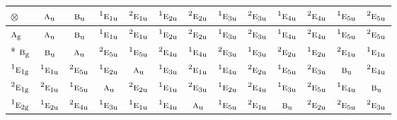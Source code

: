 \documentclass[10pt,a4paper]{article}
\numberwithin{equation}{section}
\newcommand{\irr}[1]{\text{\normalfont\scshape #1}}
\newcommand{\conjpair}[1]{{}^{#1}}
\newcommand{\ptag}[1]{\mathrm{#1}}
\newcommand{\irrprod}{\otimes}
\begin{document}
{\small\setlength{\tabcolsep}{3pt}\begin{longtable}{@{}lcccccccccccc@{}}\toprule
$\irrprod$ & $\irr{a}_{\ptag{u}}$ & $\irr{b}_{\ptag{u}}$ & $\conjpair{1}\irr{e}_{1\ptag{u}}$ & $\conjpair{2}\irr{e}_{1\ptag{u}}$ & $\conjpair{1}\irr{e}_{2\ptag{u}}$ & $\conjpair{2}\irr{e}_{2\ptag{u}}$ & $\conjpair{1}\irr{e}_{3\ptag{u}}$ & $\conjpair{2}\irr{e}_{3\ptag{u}}$ & $\conjpair{1}\irr{e}_{4\ptag{u}}$ & $\conjpair{2}\irr{e}_{4\ptag{u}}$ & $\conjpair{1}\irr{e}_{5\ptag{u}}$ & $\conjpair{2}\irr{e}_{5\ptag{u}}$\\\midrule\endhead
\bottomrule\endfoot\endlastfoot
$\irr{a}_{\ptag{g}}$ & $\irr{a}_{\ptag{u}}$ & $\irr{b}_{\ptag{u}}$ & $\conjpair{1}\irr{e}_{1\ptag{u}}$ & $\conjpair{2}\irr{e}_{1\ptag{u}}$ & $\conjpair{1}\irr{e}_{2\ptag{u}}$ & $\conjpair{2}\irr{e}_{2\ptag{u}}$ & $\conjpair{1}\irr{e}_{3\ptag{u}}$ & $\conjpair{2}\irr{e}_{3\ptag{u}}$ & $\conjpair{1}\irr{e}_{4\ptag{u}}$ & $\conjpair{2}\irr{e}_{4\ptag{u}}$ & $\conjpair{1}\irr{e}_{5\ptag{u}}$ & $\conjpair{2}\irr{e}_{5\ptag{u}}$\\*
$\irr{b}_{\ptag{g}}$ & $\irr{b}_{\ptag{u}}$ & $\irr{a}_{\ptag{u}}$ & $\conjpair{2}\irr{e}_{5\ptag{u}}$ & $\conjpair{1}\irr{e}_{5\ptag{u}}$ & $\conjpair{2}\irr{e}_{4\ptag{u}}$ & $\conjpair{1}\irr{e}_{4\ptag{u}}$ & $\conjpair{2}\irr{e}_{3\ptag{u}}$ & $\conjpair{1}\irr{e}_{3\ptag{u}}$ & $\conjpair{2}\irr{e}_{2\ptag{u}}$ & $\conjpair{1}\irr{e}_{2\ptag{u}}$ & $\conjpair{2}\irr{e}_{1\ptag{u}}$ & $\conjpair{1}\irr{e}_{1\ptag{u}}$\\
$\conjpair{1}\irr{e}_{1\ptag{g}}$ & $\conjpair{1}\irr{e}_{1\ptag{u}}$ & $\conjpair{2}\irr{e}_{5\ptag{u}}$ & $\conjpair{1}\irr{e}_{2\ptag{u}}$ & $\irr{a}_{\ptag{u}}$ & $\conjpair{1}\irr{e}_{3\ptag{u}}$ & $\conjpair{2}\irr{e}_{1\ptag{u}}$ & $\conjpair{1}\irr{e}_{4\ptag{u}}$ & $\conjpair{2}\irr{e}_{2\ptag{u}}$ & $\conjpair{1}\irr{e}_{5\ptag{u}}$ & $\conjpair{2}\irr{e}_{3\ptag{u}}$ & $\irr{b}_{\ptag{u}}$ & $\conjpair{2}\irr{e}_{4\ptag{u}}$\\
$\conjpair{2}\irr{e}_{1\ptag{g}}$ & $\conjpair{2}\irr{e}_{1\ptag{u}}$ & $\conjpair{1}\irr{e}_{5\ptag{u}}$ & $\irr{a}_{\ptag{u}}$ & $\conjpair{2}\irr{e}_{2\ptag{u}}$ & $\conjpair{1}\irr{e}_{1\ptag{u}}$ & $\conjpair{2}\irr{e}_{3\ptag{u}}$ & $\conjpair{1}\irr{e}_{2\ptag{u}}$ & $\conjpair{2}\irr{e}_{4\ptag{u}}$ & $\conjpair{1}\irr{e}_{3\ptag{u}}$ & $\conjpair{2}\irr{e}_{5\ptag{u}}$ & $\conjpair{1}\irr{e}_{4\ptag{u}}$ & $\irr{b}_{\ptag{u}}$\\
$\conjpair{1}\irr{e}_{2\ptag{g}}$ & $\conjpair{1}\irr{e}_{2\ptag{u}}$ & $\conjpair{2}\irr{e}_{4\ptag{u}}$ & $\conjpair{1}\irr{e}_{3\ptag{u}}$ & $\conjpair{1}\irr{e}_{1\ptag{u}}$ & $\conjpair{1}\irr{e}_{4\ptag{u}}$ & $\irr{a}_{\ptag{u}}$ & $\conjpair{1}\irr{e}_{5\ptag{u}}$ & $\conjpair{2}\irr{e}_{1\ptag{u}}$ & $\irr{b}_{\ptag{u}}$ & $\conjpair{2}\irr{e}_{2\ptag{u}}$ & $\conjpair{2}\irr{e}_{5\ptag{u}}$ & $\conjpair{2}\irr{e}_{3\ptag{u}}$\\

\end{longtable}}
\end{document}
